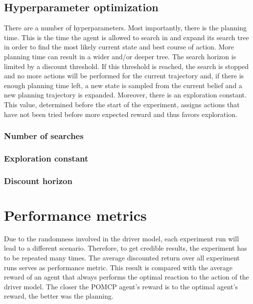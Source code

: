 \subsection{Hyperparameter optimization}
There are a number of hyperparameters. Most importantly, there is the planning time. This is the time the agent is allowed to search in and expand its search tree in order to find the most likely current state and best course of action. More planning time can result in a wider and/or deeper tree. The search horizon is limited by a discount threshold. If this threshold is reached, the search is stopped and no more actions will be performed for the current trajectory and, if there is enough planning time left, a new state is sampled from the current belief and a new planning trajectory is expanded. Moreover, there is an exploration constant. This value, determined before the start of the experiment, assigns actions that have not been tried before more expected reward and thus favors exploration.
\subsubsection{Number of searches}
\subsubsection{Exploration constant}
\subsubsection{Discount horizon}

\section{Performance metrics}
Due to the randomness involved in the driver model, each experiment run will lead to a different scenario. Therefore, to get credible results, the experiment has to be repeated many times. The average discounted return over all experiment runs serves as performance metric. This result is compared with the average reward of an agent that always performs the optimal reaction to the action of the driver model. The closer the POMCP agent's reward is to the optimal agent's reward, the better was the planning.

